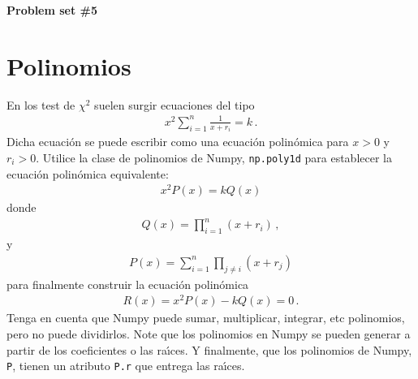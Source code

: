 \documentclass[12pt]{article}
\begin{document}
\noindent{}\hrulefill{}
\begin{flushright}
  \textbf{\large{Problem set \#5}}
\end{flushright}
\tableofcontents{}
\noindent{}\hrulefill{}
\section{Polinomios}
En los test de $\chi^2$ suelen surgir ecuaciones del tipo
\begin{align}
  x^2\sum_{i=1}^n\frac{1}{x+r_i}=k\,.
\end{align}
Dicha ecuaci\'on se puede escribir como una ecuaci\'on polin\'omica para $x>0$ y $r_i>0$. Utilice la clase de polinomios de Numpy, \texttt{np.poly1d} para establecer la ecuaci\'on polin\'omica equivalente:
\begin{align}
  x^2P(x)=k Q(x)
\end{align}
donde
\begin{align}
  Q(x)=\prod_{i=1}^n(x+r_i)\,,
\end{align}
y
\begin{align}
  P(x)=\sum_{i=1}^n\prod_{j\neq i}(x+r_j)
\end{align}
para finalmente construir la ecuaci\'on polin\'omica
\begin{align}
  R(x)= x^2P(x)-k Q(x)=0\,.
\end{align}
Tenga en cuenta que Numpy puede sumar, multiplicar, integrar, etc polinomios, pero no puede dividirlos. Note que los polinomios en Numpy se pueden generar a partir de los coeficientes o las ra\'\i ces. Y finalmente, que  los polinomios de Numpy, \texttt{P}, tienen un atributo \texttt{P.r} que entrega las ra\'\i ces.  
\end{document}
